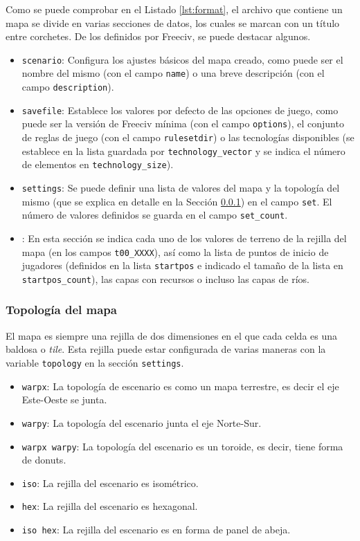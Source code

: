 Como se puede comprobar en el Listado \ref{lst:format}, el archivo que contiene un mapa se divide en varias secciones de datos, los cuales se marcan con un título entre corchetes. De los definidos por Freeciv, se puede destacar algunos.

\begin{itemize}
	\item \texttt{scenario}: Configura los ajustes básicos del mapa creado, como puede ser el nombre del mismo (con el campo \texttt{name}) o una breve descripción (con el campo \texttt{description}).
	\item \texttt{savefile}: Establece los valores por defecto de las opciones de juego, como puede ser la versión de Freeciv mínima (con el campo \texttt{options}), el conjunto de reglas de juego (con el campo \texttt{rulesetdir}) o las tecnologías disponibles (se establece en la lista guardada por \texttt{technology\_vector} y se indica el número de elementos en \texttt{technology\_size}).
	\item \texttt{settings}: Se puede definir una lista de valores del mapa y la topología del mismo (que se explica en detalle en la Sección \ref{subsubsec:topology}) en el campo \texttt{set}. El número de valores definidos se guarda en el campo \texttt{set\_count}.
	\item {}: En esta sección se indica cada uno de los valores de terreno de la rejilla del mapa (en los campos \texttt{t00\_XXXX}), así como la lista de puntos de inicio de jugadores (definidos en la lista \texttt{startpos} e indicado el tamaño de la lista en \texttt{startpos\_count}), las capas con recursos o incluso las capas de ríos.
\end{itemize}

\subsubsection{Topología del mapa}
\label{subsubsec:topology}

El mapa es siempre una rejilla de dos dimensiones en el que cada celda es una baldosa o \textit{tile}. Esta rejilla puede estar configurada de varias maneras con la variable \texttt{topology} en la sección \texttt{settings}.

\begin{itemize}
	\item \texttt{warpx}: La topología de escenario es como un mapa terrestre, es decir el eje Este-Oeste se junta.
	\item \texttt{warpy}: La topología del escenario junta el eje Norte-Sur.
	\item \texttt{warpx warpy}: La topología del escenario es un toroide, es decir, tiene forma de donuts.
	\item \texttt{iso}: La rejilla del escenario es isométrico.
	\item \texttt{hex}: La rejilla del escenario es hexagonal.
	\item \texttt{iso hex}: La rejilla del escenario es en forma de panel de abeja.
\end{itemize}

